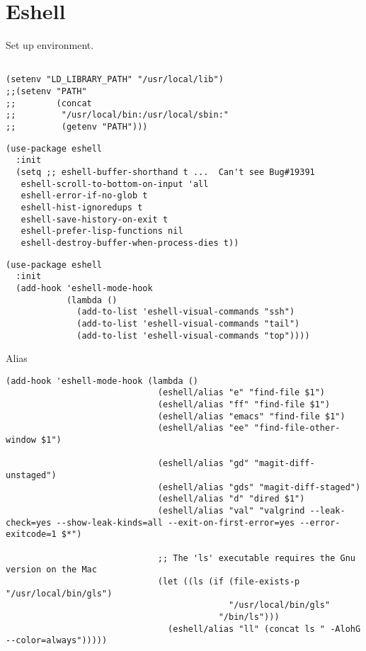 \documentclass[12pt]{article}
\begin{document}
\section{Eshell}
\label{sec:org691d936}

Set up environment.
\begin{verbatim}

(setenv "LD_LIBRARY_PATH" "/usr/local/lib")
;;(setenv "PATH"
;;        (concat
;;         "/usr/local/bin:/usr/local/sbin:"
;;         (getenv "PATH")))

\end{verbatim}

\begin{verbatim}
(use-package eshell
  :init
  (setq ;; eshell-buffer-shorthand t ...  Can't see Bug#19391
   eshell-scroll-to-bottom-on-input 'all
   eshell-error-if-no-glob t
   eshell-hist-ignoredups t
   eshell-save-history-on-exit t
   eshell-prefer-lisp-functions nil
   eshell-destroy-buffer-when-process-dies t))
\end{verbatim}

\begin{verbatim}
(use-package eshell
  :init
  (add-hook 'eshell-mode-hook
            (lambda ()
              (add-to-list 'eshell-visual-commands "ssh")
              (add-to-list 'eshell-visual-commands "tail")
              (add-to-list 'eshell-visual-commands "top"))))
\end{verbatim}

Alias
\begin{verbatim}
(add-hook 'eshell-mode-hook (lambda ()
                              (eshell/alias "e" "find-file $1")
                              (eshell/alias "ff" "find-file $1")
                              (eshell/alias "emacs" "find-file $1")
                              (eshell/alias "ee" "find-file-other-window $1")

                              (eshell/alias "gd" "magit-diff-unstaged")
                              (eshell/alias "gds" "magit-diff-staged")
                              (eshell/alias "d" "dired $1")
                              (eshell/alias "val" "valgrind --leak-check=yes --show-leak-kinds=all --exit-on-first-error=yes --error-exitcode=1 $*")

                              ;; The 'ls' executable requires the Gnu version on the Mac
                              (let ((ls (if (file-exists-p "/usr/local/bin/gls")
                                            "/usr/local/bin/gls"
                                          "/bin/ls")))
                                (eshell/alias "ll" (concat ls " -AlohG --color=always")))))
\end{verbatim}
\end{document}
